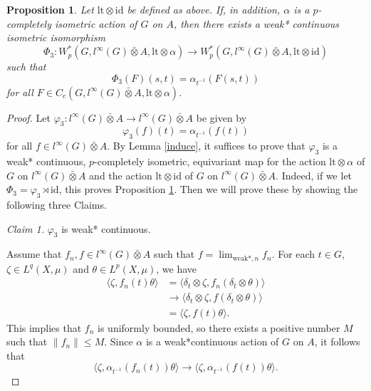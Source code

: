 \documentclass[reqno,11pt]{amsart}
\theoremstyle{plain}
\newtheorem{prop}[thm]{Proposition}
\theoremstyle{definition}
\theoremstyle{remark}
\newcommand{\la}{\langle}
\newcommand{\ra}{\rangle}
\begin{document}
\begin{prop}\label{3}
Let $\mathrm{lt}\otimes\mathrm{id}$ be defined as above. If, in addition, $\alpha$ is a $p$-completely isometric action of $G$ on $A$, then
there exists a weak* continuous isometric isomorphism $$\Phi_3:W^*_p(G,l^\infty(G)\bar{\otimes}A,\mathrm{lt}\otimes\alpha)\rightarrow W^*_p(G,l^\infty(G)\bar{\otimes}A,\mathrm{lt}\otimes\mathrm{id})$$ such that $$\Phi_3(F)(s,t)=\alpha_{t^{-1}}(F(s,t))$$ for all $F\in C_c(G,l^\infty(G)\bar{\otimes}A,\mathrm{lt}\otimes\alpha)$.
\end{prop}
\begin{proof}
Let $\varphi_3:l^\infty(G)\bar{\otimes}A\rightarrow l^\infty(G)\bar{\otimes}A$ be given by $$\varphi_3(f)(t)=\alpha_{t^{-1}}(f(t))$$ for all $f\in l^\infty(G)\bar{\otimes}A$. By Lemma \ref{induce}, it suffices to prove that $\varphi_3$ is a weak* continuous, $p$-completely isometric, equivariant map for the action $\mathrm{lt}\otimes\alpha$ of $G$ on $l^\infty(G)\bar{\otimes}A$ and the action $\mathrm{lt}\otimes\mathrm{id}$ of $G$ on $l^\infty(G)\bar{\otimes}A$.
Indeed, if we let $\Phi_3=\varphi_3\rtimes\mathrm{id}$, this proves Proposition \ref{3}.
Then we will prove these by showing the following three Claims.

{\it Claim 1.} $\varphi_3$ is weak* continuous.

Assume that $f_n,f\in l^\infty(G)\bar{\otimes}A$ such that $f=\lim_{\mathrm{weak}*,n}f_n$. For each $t\in G$, $\zeta\in L^q(X,\mu)$ and $\theta\in L^p(X,\mu)$, we have
$$\begin{aligned} \la \zeta, f_n(t)\theta\ra
 &=\la \delta_t\otimes \zeta, f_n(\delta_t\otimes\theta)\ra \\
 &\rightarrow \la \delta_t\otimes \zeta, f(\delta_t\otimes\theta)\ra\\
 &=\la \zeta,f(t)\theta\ra. \end{aligned}$$
This implies that $f_n$ is uniformly bounded, so there exists a positive number $M$ such that $\|f_n\|\leq M.$
Since $\alpha$ is a weak*continuous action of $G$ on $A$, it follows that $$\la\zeta,\alpha_{t^{-1}}(f_n(t))\theta\ra\rightarrow \la\zeta,\alpha_{t^{-1}}(f(t))\theta\ra.$$


\end{proof}
\end{document}
